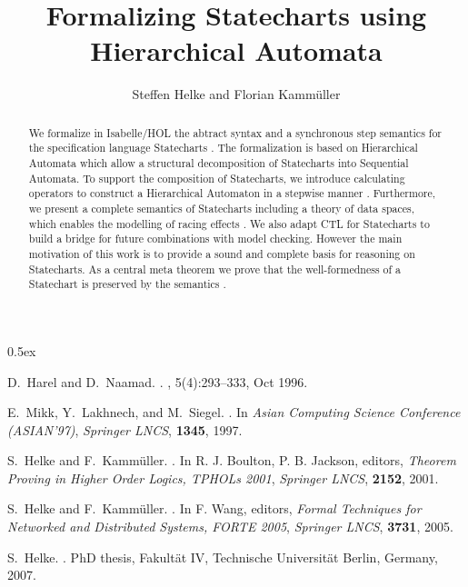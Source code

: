 \documentclass[11pt,a4paper]{article}
\begin{document}
\title{Formalizing Statecharts using Hierarchical Automata}
\author{Steffen Helke and Florian Kamm\"uller}
\maketitle

\begin{abstract}
We formalize in Isabelle/HOL the abtract syntax and a synchronous step
semantics for the specification language Statecharts \cite{HN96}. The
formalization is based on Hierarchical Automata \cite{MLS97} 
which allow a structural decomposition of Statecharts into Sequential
Automata. To support the composition of Statecharts, we introduce 
calculating operators to construct a Hierarchical Automaton in a 
stepwise manner \cite{HK01}. Furthermore, we present a complete
semantics of Statecharts including a theory of data spaces, which enables 
the modelling of racing effects \cite{HK05}. We also adapt CTL for 
Statecharts to build a bridge for future combinations with
model checking. However the main motivation of this work is to provide a 
sound and complete basis for reasoning on
Statecharts. As a central meta theorem we prove that the 
well-formedness of a Statechart is preserved by the 
semantics \cite{Hel07}.    
\end{abstract}

\tableofcontents

\parindent 0pt\parskip 0.5ex




%
\begin{thebibliography}{MLSH99}

D.~Harel and D.~Naamad.
.
,
  5(4):293--333, Oct 1996.

E.~Mikk, Y.~Lakhnech, and M.~Siegel.
.
\newblock In {\em Asian Computing Science Conference (ASIAN'97)},
\newblock \textit{Springer LNCS}, \textbf{1345}, 1997.
 
S.~Helke and F.~Kamm{\"u}ller.
.
\newblock In R. J. Boulton, P. B. Jackson, editors, {\em Theorem
Proving in Higher Order Logics, TPHOLs 2001}, \textit{Springer LNCS},
\textbf{2152}, 2001.

S.~Helke and F.~Kamm{\"u}ller.
.
\newblock In F. Wang, editors, {\em  Formal Techniques
  for Networked and Distributed Systems, FORTE 2005}, \textit{Springer LNCS},
\textbf{3731}, 2005.

S.~Helke.
.
\newblock PhD thesis, Fakult{\"a}t IV, Technische Universit{\"a}t Berlin, Germany, 2007.

\end{thebibliography}
\end{document}

